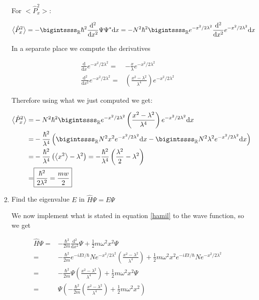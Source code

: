 \documentclass[11pt,letterpaper]{article}%
\newcommand{\dx}{\mathrm{d}x}
\begin{document}
\begin{enumerate}
{For $\big<\hat{P}_x^2\big>$:

\begin{equation}
\label{p3:7}
\big<\hat{P}_x^2\big> = -\bigintssss_{\mathbb{R}}\hbar^2\frac{\mathrm{d}^2}{\mathrm{d}x^2}\Psi\Psi^*\dx = -N^2\hbar^2\bigintssss_{\mathbb{R}}e^{-x^2/2\lambda^2}\frac{\mathrm{d}^2}{\mathrm{d}x^2}e^{-x^2/2\lambda^2}\dx
\end{equation}

In a separate place we compute the derivatives

\begin{equation}
\label{deriv}
\begin{split}
\frac{\mathrm{d}}{\mathrm{d}x}e^{-x^2/2\lambda^2} =& -\frac{x}{\lambda}e^{-x^2/2\lambda^2}\\ 
\frac{\mathrm{d}^2}{\mathrm{d}x^2}e^{-x^2/2\lambda^2} =& \left( \frac{x^2 - \lambda^2}{\lambda^4} \right)e^{-x^2/2\lambda^2}
\end{split}
\end{equation}

Therefore using what we just computed we get:

\begin{equation}
\label{p3:8}
\begin{split}
\big<\hat{P}_x^2\big> =&  -N^2\hbar^2\bigintssss_{\mathbb{R}}e^{-x^2/2\lambda^2}\left( \frac{x^2 - \lambda^2}{\lambda^4} \right)e^{-x^2/2\lambda^2}\dx\\
=& -\frac{\hbar^2}{\lambda^4}\left( \bigintssss_{\mathbb{R}}N^2x^2e^{-x^2/2\lambda^2}\dx - \bigintssss_{\mathbb{R}}N^2\lambda^2e^{-x^2/2\lambda^2}\dx\right)\\
=& -\frac{\hbar^2}{\lambda^4}\left( \big<x^2\big> - \lambda^2  \right) = -\frac{\hbar^2}{\lambda^4}\left( \frac{\lambda^2}{2} - \lambda^2 \right)\\
=& \boxed{\frac{\hbar^2}{2\lambda^2} = \frac{mw}{2}}
\end{split}
\end{equation}
}

\item
{
Find the eigenvalue $E$ in $\hat{H}\Psi = E\Psi$

We now implement what is stated in equation \eqref{hamil} to the wave function, so we get

\begin{equation}
\label{p4:1}
\begin{split}
\hat{H}\Psi =& -\frac{\hbar^2}{2m}\frac{\mathrm{d}^2}{\mathrm{d}x^2}\Psi + \frac{1}{2}m\omega^2x^2\Psi\\
=& -\frac{\hbar^2}{2m}e^{-iEt/\hbar}Ne^{-x^2/2\lambda^2}\left( \frac{x^2 - \lambda^2}{\lambda^4} \right) + \frac{1}{2}m\omega^2x^2e^{-iEt/\hbar}Ne^{-x^2/2\lambda^2}\\
=& -\frac{\hbar^2}{2m}\Psi\left( \frac{x^2 - \lambda^2}{\lambda^4} \right) + \frac{1}{2}m\omega^2x^2\Psi\\
=& \Psi\left( -\frac{\hbar^2}{2m}\left( \frac{x^2 - \lambda^2}{\lambda^4} \right) + \frac{1}{2}m\omega^2x^2 \right)
\end{split}
\end{equation}

}
\end{enumerate}
\end{document}
